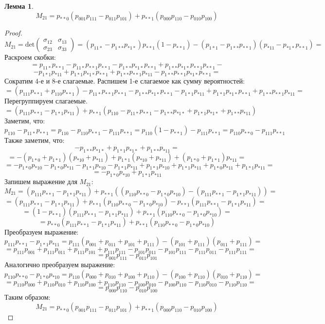 \documentclass{article}
\theoremstyle{definition}
\newtheorem{lemma}{Лемма}[section]
\begin{document}
\begin{lemma}\label{partial_cov}
    $$M_{21} = p_{**0}(p_{001}p_{111}-p_{011}p_{101}) + p_{**1} (p_{000}p_{110}-p_{010}p_{100})$$
\end{lemma}
\begin{proof}
    $$ M_{21}= \text{det}
        \begin{pmatrix}
            \sigma_{12} & \sigma_{13} \\
            \sigma_{23} & \sigma_{33}
        \end{pmatrix}
        = (p_{11*}-p_{1**}p_{*1*}) p_{**1}(1-p_{**1})-(p_{1*1}-p_{1**}p_{**1})(p_{*11}-p_{*1*}p_{**1})=
    $$
    Раскроем скобки:
    $$
        =p_{11*}p_{**1} - p_{11*}p_{**1}p_{**1} - p_{1**}p_{*1*}p_{**1} + p_{1**}p_{*1*}p_{**1}p_{**1}-
    $$
    $$
        -p_{1*1}p_{*11}+p_{1*1}p_{*1*}p_{**1}+p_{1**}p_{**1}p_{*11}-p_{1**}p_{**1}p_{*1*}p_{**1}=
    $$
    Сократим 4-е и 8-е слагаемые. Распишем 1-е слагаемое как сумму вероятностей:
    $$
        =(p_{111}p_{**1}+p_{110}p_{**1}) - p_{11*}p_{**1}p_{**1} - p_{1**}p_{*1*}p_{**1} -p_{1*1}p_{*11}+p_{1*1}p_{*1*}p_{**1}+p_{1**}p_{**1}p_{*11}=
    $$
    Перегруппируем слагаемые.
    $$
        =(p_{111}p_{**1}-p_{1*1}p_{*11})+p_{**1}(p_{110}-p_{11*}p_{**1} - p_{1**}p_{*1*} + p_{1*1}p_{*1*} + p_{1**}p_{*11})
    $$
    Заметим, что:
    $$
        p_{110}-p_{11*}p_{**1}=p_{110}-p_{110}p_{**1}-p_{111}p_{**1}=p_{110}(1-p_{**1})-p_{111}p_{**1}=p_{110}p_{**0}-p_{111}p_{**1}
    $$
    Также заметим, что:
    $$
        -p_{1**}p_{*1*} + p_{1*1}p_{*1*} + p_{1**}p_{*11}=
    $$
    $$
        =-(p_{1*0}+p_{1*1})(p_{*10}+p_{*11})+p_{1*1}(p_{*10}+p_{*11}) + (p_{1*0}+p_{1*1})p_{*11}=
    $$
    $$
        =-p_{1*0}p_{*10}-p_{1*0}p_{*11}-p_{1*1}p_{*10}-p_{1*1}p_{*11}+p_{1*1}p_{*10}+p_{1*1}p_{*11}+p_{1*0}p_{*11}+p_{1*1}p_{*11}=
    $$
    $$
        =-p_{1*0}p_{*10}+p_{1*1}p_{*11}
    $$
    Запишем выражение для $M_{21}$:
    $$
        M_{21}=(p_{111}p_{**1}-p_{1*1}p_{*11})+p_{**1}((p_{110}p_{**0}-p_{1*0}p_{*10})-(p_{111}p_{**1}-p_{1*1}p_{*11}))=
    $$
    $$
        =(p_{111}p_{**1}-p_{1*1}p_{*11})+p_{**1}(p_{110}p_{**0}-p_{1*0}p_{*10})-p_{**1}(p_{111}p_{**1}-p_{1*1}p_{*11})=
    $$
    $$
        =(1-p_{**1})(p_{111}p_{**1}-p_{1*1}p_{*11})+p_{**1}(p_{110}p_{**0}-p_{1*0}p_{*10})=
    $$
    $$
        =p_{**0}(p_{111}p_{**1}-p_{1*1}p_{*11})+p_{**1}(p_{110}p_{**0}-p_{1*0}p_{*10})
    $$
    Преобразуем выражение:
    $$
        p_{111}p_{**1}-p_{1*1}p_{*11} = p_{111}(p_{001}+p_{011}+p_{101}+p_{111})-
        (p_{101}+p_{111})(p_{011}+p_{111})=
    $$
    $$
        = p_{111}p_{001}+p_{111}p_{011}+p_{111}p_{101}+p_{111}p_{111}
        - p_{101}p_{011}-p_{101}p_{111}-p_{111}p_{011}-p_{111}p_{111}=
    $$
    $$
        = p_{001}p_{111}-p_{011}p_{101}
    $$
    Аналогично преобразуем выражение:
    $$
        p_{110}p_{**0}-p_{1*0}p_{*10}=
        p_{110}(p_{000}+p_{010}+p_{100}+p_{110})-(p_{100}+p_{110})(p_{010}+p_{110})=
    $$
    $$
        =p_{110}p_{000}+p_{110}p_{010}+p_{110}p_{100}+p_{110}p_{110}
        -p_{100}p_{010}-p_{100}p_{110}-p_{110}p_{010}-p_{110}p_{110}=
    $$
    $$
        =p_{000}p_{110}-p_{010}p_{100}
    $$
    Таким образом:
    $$
        M_{21} = p_{**0}(p_{001}p_{111}-p_{011}p_{101}) + p_{**1} (p_{000}p_{110}-p_{010}p_{100})
    $$
\end{proof}
\end{document}
